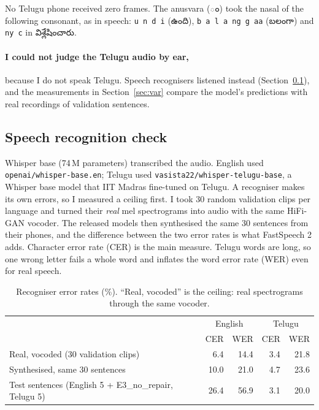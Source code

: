\documentclass[11pt,a4paper]{article}
\newcommand{\tel}[1]{{\te #1}}
\newcommand{\code}[1]{\texttt{#1}}
\begin{document}
No Telugu phone received zero frames. The anusvara (\tel{ం}) took the nasal of the following consonant, as in
speech: \code{u n d i} (\tel{ఉంది}), \code{b a l a ng g aa} (\tel{బలంగా}) and \code{ny c} in
\tel{విశ్లేషించారు}.

\paragraph{I could not judge the Telugu audio by ear,} because I do not speak Telugu. Speech recognisers listened
instead (Section~\ref{sec:asr}), and the measurements in Section~\ref{sec:var} compare the model's predictions with real
recordings of validation sentences.

\subsection{Speech recognition check}
\label{sec:asr}
Whisper base (74\,M parameters) transcribed the audio. English used \code{openai/whisper-base.en}; Telugu used
\code{vasista22/whisper-telugu-base}, a Whisper base model that IIT Madras fine-tuned on Telugu. A recogniser
makes its own errors, so I measured a ceiling first. I took 30 random validation clips per language and turned
their \emph{real} mel spectrograms into audio with the same HiFi-GAN vocoder. The released models then synthesised
the same 30 sentences from their phones, and the difference between the two error rates is what FastSpeech 2
adds. Character error rate (CER) is the main measure. Telugu words are long, so one wrong letter fails a whole
word and inflates the word error rate (WER) even for real speech.

\begin{table}[H]\centering\small
\caption{Recogniser error rates (\%). ``Real, vocoded'' is the ceiling: real spectrograms through the same vocoder.}
\label{tab:asr}
\begin{tabular}{@{}lrrrr@{}}
\toprule
 & \multicolumn{2}{c}{English} & \multicolumn{2}{c}{Telugu} \\
 & CER & WER & CER & WER \\
\midrule
Real, vocoded (30 validation clips) & 6.4 & 14.4 & 3.4 & 21.8 \\
Synthesised, same 30 sentences & 10.0 & 21.0 & 4.7 & 23.6 \\
Test sentences (English 5 + E3\_no\_repair, Telugu 5) & 26.4 & 56.9 & 3.1 & 20.0 \\
\bottomrule
\end{tabular}
\end{table}
\end{document}
